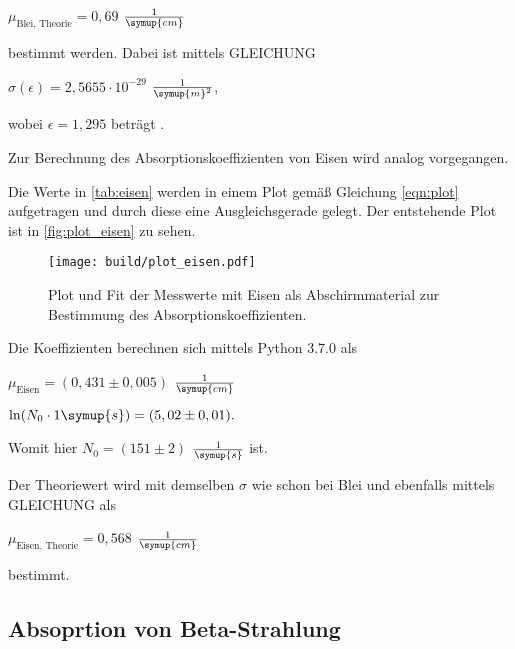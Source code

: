 \begin{center}
    $\mu_\text{Blei, Theorie} = 0,69$ $\frac{1}{\symup{cm}}$
\end{center}

bestimmt werden.
Dabei ist mittels GLEICHUNG

\begin{center}
    $\sigma (\epsilon ) = 2,5655 \cdot 10^{-29}$ $\frac{1}{\symup{m}^2}$,
\end{center}

wobei $\epsilon = 1,295$ beträgt \cite{V704}.

Zur Berechnung des Absorptionskoeffizienten von Eisen wird analog vorgegangen.



Die Werte in \autoref{tab:eisen} werden in einem Plot gemäß Gleichung \eqref{eqn:plot} aufgetragen und durch diese eine Ausgleichsgerade gelegt.
Der entstehende Plot ist in \autoref{fig:plot_eisen} zu sehen.

\begin{figure}
    \centering
    \texttt{[image: build/plot\_eisen.pdf]}
    \caption{Plot und Fit der Messwerte mit Eisen als Abschirmmaterial zur Bestimmung des Absorptionskoeffizienten.}
    \label{fig:plot_eisen}
\end{figure}

Die Koeffizienten berechnen sich mittels Python 3.7.0 als

\begin{center}
    $\mu_\text{Eisen} = (0,431 \pm 0,005)$ $\frac{1}{\symup{cm}}$

    $\ln ( N_ 0 \cdot 1 \symup{s}) = (5,02  \pm 0,01).$
\end{center}

Womit hier $N_0 = (151 \pm 2)$ $\frac{1}{\symup{s}}$ ist.

Der Theoriewert wird mit demselben $\sigma$ wie schon bei Blei und ebenfalls mittels GLEICHUNG als

\begin{center}
    $\mu_\text{Eisen, Theorie} = 0,568$ $\frac{1}{\symup{cm}}$
\end{center}

bestimmt.



\subsection{Absoprtion von Beta-Strahlung}

